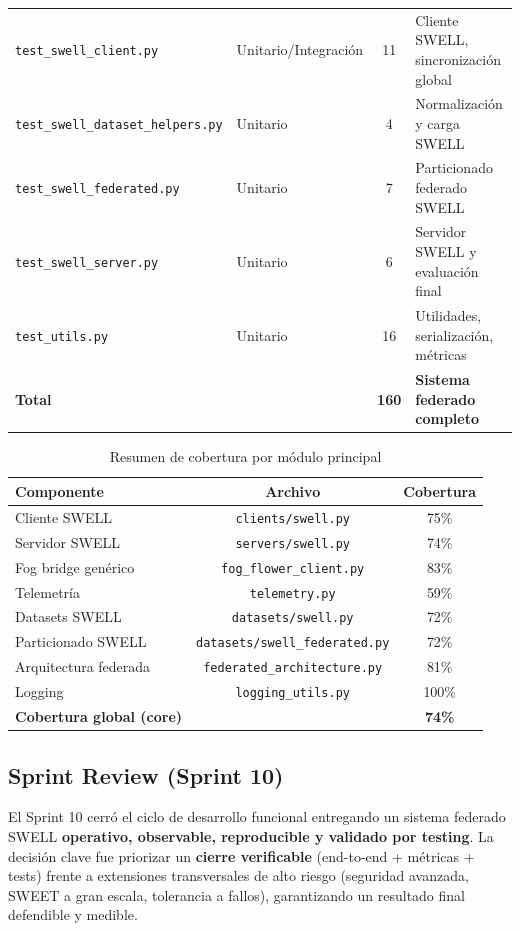 \documentclass{report}
\begin{document}
\begin{table}[H]
\begin{tabular}{llcl}
\texttt{test\_swell\_client.py} & Unitario/Integración & 11 & Cliente SWELL, sincronización global \\
\texttt{test\_swell\_dataset\_helpers.py} & Unitario & 4 & Normalización y carga SWELL \\
\texttt{test\_swell\_federated.py} & Unitario & 7 & Particionado federado SWELL \\
\texttt{test\_swell\_server.py} & Unitario & 6 & Servidor SWELL y evaluación final \\
\texttt{test\_utils.py} & Unitario & 16 & Utilidades, serialización, métricas \\
\hline
\textbf{Total} & & \textbf{160} & \textbf{Sistema federado completo} \\
\hline
\end{tabular}
\end{table}

\begin{table}[H]
\centering
\footnotesize
\caption{Resumen de cobertura por módulo principal}
\label{tab:coverage_summary}
\renewcommand{\arraystretch}{1.2}
\begin{tabular}{lcc}
\hline
\textbf{Componente} & \textbf{Archivo} & \textbf{Cobertura} \\
\hline
Cliente SWELL & \texttt{clients/swell.py} & 75\% \\
Servidor SWELL & \texttt{servers/swell.py} & 74\% \\
Fog bridge genérico & \texttt{fog\_flower\_client.py} & 83\% \\
Telemetría & \texttt{telemetry.py} & 59\% \\
Datasets SWELL & \texttt{datasets/swell.py} & 72\% \\
Particionado SWELL & \texttt{datasets/swell\_federated.py} & 72\% \\
Arquitectura federada & \texttt{federated\_architecture.py} & 81\% \\
Logging & \texttt{logging\_utils.py} & 100\% \\
\hline
\textbf{Cobertura global (core)} & & \textbf{74\%} \\
\hline
\end{tabular}
\end{table}

\vspace{0.5em}


\subsection{Sprint Review (Sprint 10)}
El Sprint 10 cerró el ciclo de desarrollo funcional entregando un sistema federado SWELL \textbf{operativo, observable, reproducible y validado por testing}. La decisión clave fue priorizar un \textbf{cierre verificable} (end-to-end + métricas + tests) frente a extensiones transversales de alto riesgo (seguridad avanzada, SWEET a gran escala, tolerancia a fallos), garantizando un resultado final defendible y medible.
\end{document}
